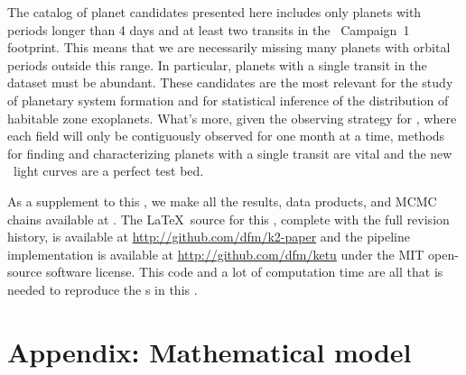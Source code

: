 The catalog of planet candidates presented here includes only planets with
periods longer than 4 days and at least two transits in the \KT\ Campaign~1
footprint.
This means that we are necessarily missing many planets with orbital periods
outside  this range.
In particular, planets with a single transit in the dataset must be
abundant.
These candidates are the most relevant for the study of planetary system
formation and for statistical inference of the distribution of habitable zone
exoplanets.
What's more, given the observing strategy for \tess, where each field will
only be contiguously observed for one month at a time, methods for finding and
characterizing planets with a single transit are vital and the new \KT\ light
curves are a perfect test bed.

As a supplement to this \paper, we make all the results, data products, and
MCMC chains available at \datareleaseurl.
The \LaTeX\ source for this \paper, complete with the full revision history,
is available at \url{http://github.com/dfm/k2-paper} and the pipeline
implementation is available at \url{http://github.com/dfm/ketu} under the MIT
open-source software license.
This code and a lot of computation time are all that is needed to reproduce
the \figurename s in this \paper.

\section{Appendix: Mathematical model}

